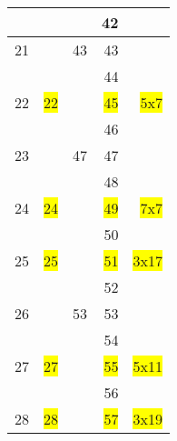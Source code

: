 \begin{tabular}{|r|r|r|r|r|}
\hline                              &                        &         &     42    &                                \\
\hline               21             &                        &     43  &     43    &                                \\
\hline                              &                        &         &     44    &                                \\
\hline               22             &   \colorbox{yellow}{22}&         &     \colorbox{yellow}{45}    &     \colorbox{yellow}{5x7  }   \\
\hline                              &                        &         &     46    &                                \\
\hline               23             &                        &     47  &     47    &                                \\
\hline                              &                        &         &     48    &                                \\
\hline               24             &   \colorbox{yellow}{24}&         &     \colorbox{yellow}{49}    &     \colorbox{yellow}{7x7  }   \\
\hline                              &                        &         &     50    &                                \\
\hline               25             &   \colorbox{yellow}{25}&         &     \colorbox{yellow}{51}    &     \colorbox{yellow}{3x17  }  \\
\hline                              &                        &         &     52    &                                \\
\hline               26             &                        &     53  &     53    &                                \\
\hline                              &                        &         &     54    &                                \\
\hline               27             &   \colorbox{yellow}{27}&         &     \colorbox{yellow}{55}    &     \colorbox{yellow}{5x11  }  \\
\hline                              &                        &         &     56    &                                \\
\hline               28             &   \colorbox{yellow}{28}&         &     \colorbox{yellow}{57}    &     \colorbox{yellow}{3x19  }  \\

\end{tabular}
